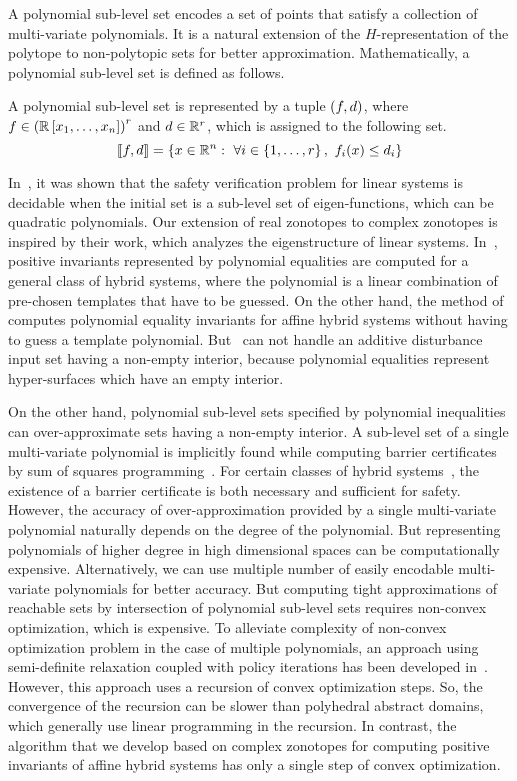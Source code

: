 A polynomial sub-level set encodes a set of points that satisfy
a collection of multi-variate polynomials.  It
is a natural extension of the $H$-representation of the polytope to
non-polytopic sets for better approximation.  Mathematically, a
polynomial sub-level set is defined as follows.
%
\begin{definition}
A polynomial sub-level set is represented by a tuple $\left(f,d\right)$,
where 
$f\in\left(\mathbb{R}\left[x_1,\ldots,x_n\right]\right)^r$ and $d\in\mathbb{R}^r$,
which is assigned to the following set.
%
\[
\left\llbracket f,d\right\rrbracket=\left\{x\in\mathbb{R}^n:~\forall
  i\in\left\{1,\ldots,r\right\},~f_i(x)\leq d_i\right\}
\]
%
\end{definition}
%
In~\cite{duggirala2013safety}, it was shown that the safety
verification problem for linear systems is decidable when the initial
set is a sub-level set of eigen-functions, which can be quadratic
polynomials.  Our extension of real zonotopes to complex zonotopes is
inspired by their work, which analyzes the eigenstructure of linear
systems.  In~\cite{Sriram}, positive invariants represented by
polynomial equalities are computed for a general class of hybrid
systems, where the polynomial is a linear combination of pre-chosen
templates that have to be guessed.  On the other hand, the method
of~\cite{tiwariRodriguezCarbonellPolynomialInvariants} computes
polynomial equality invariants for affine hybrid systems without
having to guess a template polynomial.  But~\cite{Sriram,tiwariRodriguezCarbonellPolynomialInvariants}
can not handle an additive disturbance input set having a non-empty
interior, because polynomial equalities represent hyper-surfaces which
have an empty interior.

On the other hand, polynomial sub-level sets specified by polynomial
inequalities can over-approximate sets having a non-empty interior.  A
sub-level set of a single multi-variate polynomial is implicitly found
while computing barrier certificates by sum of squares
programming~\cite{prajna2004safety}.  For certain classes of hybrid
systems~\cite{prajna2005necessity}, the existence of a barrier
certificate is both necessary and sufficient for safety.  However, the
accuracy of over-approximation provided by a single multi-variate
polynomial naturally depends on the degree of the polynomial.  But
representing polynomials of higher degree in high dimensional spaces
can be computationally expensive.  Alternatively, we can use multiple
number of easily encodable multi-variate polynomials for better
accuracy.  But computing tight approximations of reachable sets by
intersection of polynomial sub-level sets requires non-convex
optimization, which is expensive.  To alleviate complexity of
non-convex optimization problem in the case of multiple polynomials,
an approach using semi-definite relaxation coupled with policy
iterations has been developed in~\cite{DBLP:conf/esop/AdjeGG10}.
However, this approach uses a recursion of convex optimization steps.
So, the convergence of the recursion can be slower than polyhedral
abstract domains, which generally use linear programming in the
recursion.  In contrast, the algorithm that we develop based on
complex zonotopes for computing positive invariants of affine hybrid
systems has only a single step of convex
optimization.
